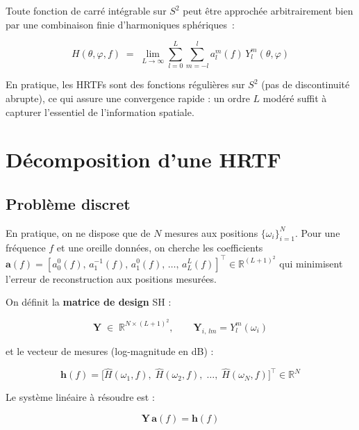 \documentclass[12pt, a4paper]{article}
\begin{document}
Toute fonction de carré intégrable sur $S^2$ peut être approchée arbitrairement
bien par une combinaison finie d'harmoniques sphériques~:

\begin{equation}
    H(\theta, \varphi, f) \;=\; \lim_{L \to \infty} \sum_{l=0}^{L} \sum_{m=-l}^{l}
    a_l^m(f)\, Y_l^m(\theta, \varphi)
    \label{eq:decomp}
\end{equation}

En pratique, les HRTFs sont des fonctions régulières sur $S^2$ (pas de
discontinuité abrupte), ce qui assure une convergence rapide : un ordre $L$
modéré suffit à capturer l'essentiel de l'information spatiale.

\section{Décomposition d'une HRTF}

\subsection{Problème discret}

En pratique, on ne dispose que de $N$ mesures aux positions
$\{\omega_i\}_{i=1}^{N}$.
Pour une fréquence $f$ et une oreille données, on cherche les coefficients
$\mathbf{a}(f) = [a_0^0(f),\, a_1^{-1}(f),\, a_1^0(f),\, \ldots,\,
a_L^L(f)]^\top \in \mathbb{R}^{(L+1)^2}$
qui minimisent l'erreur de reconstruction aux positions mesurées.

On définit la \textbf{matrice de design} SH :

\begin{equation}
    \mathbf{Y} \;\in\; \mathbb{R}^{N \times (L+1)^2},
    \qquad
    \mathbf{Y}_{i,\,lm} = Y_l^m(\omega_i)
\end{equation}

et le vecteur de mesures (log-magnitude en dB) :

\begin{equation}
    \mathbf{h}(f) = \bigl[\hat{H}(\omega_1, f),\; \hat{H}(\omega_2, f),\;
    \ldots,\; \hat{H}(\omega_N, f)\bigr]^\top \in \mathbb{R}^N
\end{equation}

Le système linéaire à résoudre est :

\begin{equation}
    \mathbf{Y}\, \mathbf{a}(f) = \mathbf{h}(f)
    \label{eq:system}
\end{equation}
\end{document}
